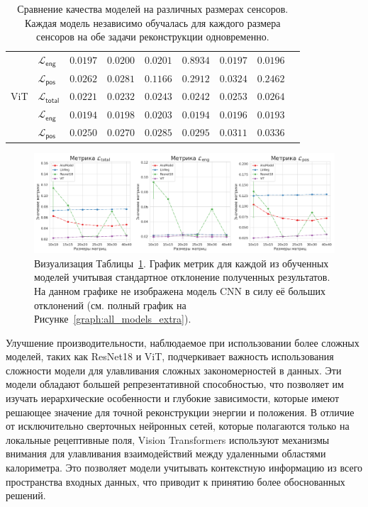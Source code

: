 \documentclass[a4paper,12pt]{extarticle}
\begin{document}
\begin{table}[t]
\begin{tabular}{llrrrrrrr}
        {} & $\mathcal{L}_{\mathsf{eng}}$ & $\mathsf{0.0197}$ & $\mathsf{0.0200}$ & $\mathsf{0.0201}$ & $\mathsf{0.8934}$ & $\mathsf{0.0197}$ & $\mathsf{0.0196}$ \\
        {} & $\mathcal{L}_{\mathsf{pos}}$ & $\mathsf{0.0262}$ & $\mathsf{0.0281}$ & $\mathsf{0.1166}$ & $\mathsf{0.2912}$ & $\mathsf{0.0324}$ & $\mathsf{0.2462}$ \\
        \midrule
        \textsf{ViT} & $\mathcal{L}_{\mathsf{total}}$ & $\mathsf{0.0221}$ & $\mathsf{0.0232}$ & $\mathsf{0.0243}$ & $\mathsf{0.0242}$ & $\mathsf{0.0253}$ & $\mathsf{0.0264}$ \\
        {} & $\mathcal{L}_{\mathsf{eng}}$ & $\mathsf{0.0194}$ & $\mathsf{0.0198}$ & $\mathsf{0.0203}$ & $\mathsf{0.0194}$ & $\mathsf{0.0196}$ & $\mathsf{0.0193}$ \\
        {} & $\mathcal{L}_{\mathsf{pos}}$ & $\mathsf{0.0250}$ & $\mathsf{0.0270}$ & $\mathsf{0.0285}$ & $\mathsf{0.0295}$ & $\mathsf{0.0311}$ & $\mathsf{0.0336}$ \\
        
		\bottomrule
	\end{tabular}
    \caption{Сравнение качества моделей на различных размерах сенсоров. Каждая модель независимо обучалась для каждого размера сенсоров на обе задачи реконструкции одновременно.}
	\label{table:all_models}
\end{table}

\begin{figure}[t]
    \centering
    \includegraphics[width=1.0\textwidth]{graphics/models_comp.png}
    \caption{Визуализация Таблицы~\ref{table:all_models}. График метрик для каждой из обученных моделей учитывая стандартное отклонение полученных результатов. На данном графике не изображена модель \textsf{CNN} в силу её больших отклонений (см. полный график на Рисунке~\ref{graph:all_models_extra}).}
    \label{graph:all_models}
\end{figure}

Улучшение производительности, наблюдаемое при использовании более сложных моделей, таких как \textsf{ResNet18} и \textsf{ViT}, подчеркивает важность использования сложности модели для улавливания сложных закономерностей в данных. Эти модели обладают большей репрезентативной способностью, что позволяет им изучать иерархические особенности и глубокие зависимости, которые имеют решающее значение для точной реконструкции энергии и положения. В отличие от исключительно сверточных нейронных сетей, которые полагаются только на локальные рецептивные поля, Vision Transformers используют механизмы внимания для улавливания взаимодействий между удаленными областями калориметра. Это позволяет модели учитывать контекстную информацию из всего пространства входных данных, что приводит к принятию более обоснованных решений.
\end{document}

